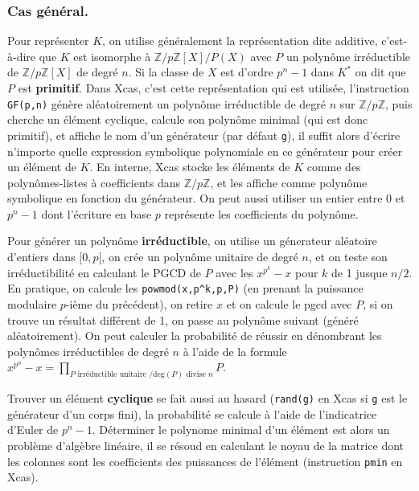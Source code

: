\documentclass[a4paper,11pt]{article}
\newcommand{\Z}{{\mathbb{Z}}}
\begin{document}
\begin{giacjshere}
\subsubsection{Cas g\'en\'eral.}
Pour repr\'esenter $K$, on utilise g\'en\'eralement la
repr\'esentation dite additive, c'est-\`a-dire que $K$
est isomorphe \`a $\Z/p\Z[X]/P(X)$ avec $P$ un polyn\^ome
irr\'eductible de $\Z/p\Z[X]$ de degr\'e $n$. Si la classe de $X$
est d'ordre $p^n-1$ dans $K^*$ on dit que $P$ est {\bf primitif}.
Dans Xcas, c'est cette repr\'esentation qui est utilis\'ee,
l'instruction \verb|GF(p,n)| g\'en\`ere al\'eatoirement
un polyn\^ome irr\'eductible de degr\'e $n$ sur $\Z/p\Z$,
puis cherche un \'el\'ement cyclique, calcule son polyn\^ome
minimal (qui est donc primitif), et affiche le nom d'un
g\'en\'erateur (par d\'efaut \verb|g|), 
il suffit alors d'\'ecrire n'importe quelle
expression symbolique polynomiale en ce g\'en\'erateur
pour cr\'eer un \'el\'ement de $K$. En interne, Xcas stocke
les \'el\'ements de $K$ comme des polyn\^omes-listes
\`a coefficients dans $\Z/p\Z$, et les affiche comme polyn\^ome
symbolique en fonction du g\'en\'erateur. On peut aussi
utiliser un entier entre 0 et $p^n-1$ dont l'\'ecriture en base
$p$ repr\'esente les coefficients du polyn\^ome.

Pour g\'en\'erer un polyn\^ome {\bf irr\'eductible}, on utilise
un g\'enerateur al\'eatoire d'entiers dans $[0,p[$,
on cr\'ee un polyn\^ome unitaire de degr\'e $n$, et
on teste son irr\'eductibilit\'e en calculant le PGCD
de $P$ avec les $x^{p^k}-x$ pour $k$ de 1 jusque $n/2$.
En pratique, on calcule les \verb|powmod(x,p^k,p,P)|
(en prenant la puissance modulaire $p$-i\`eme
du pr\'ec\'edent), on retire $x$ et on calcule le pgcd avec $P$,
si on trouve un r\'esultat diff\'erent de 1, on passe au polyn\^ome
suivant (g\'en\'er\'e al\'eatoirement).
On peut calculer la probabilit\'e de r\'eussir en d\'enombrant
les polyn\^omes irr\'eductibles de degr\'e $n$ \`a l'aide
de la formule $x^{p^n}-x=\prod_{P \mbox{ irréductible unitaire }/ \mbox{deg}(P)\mbox{ divise } n} P$.

Trouver un \'el\'ement {\bf cyclique} se fait aussi au hasard
(\verb|rand(g)| en Xcas si \verb|g| est le g\'en\'erateur
d'un corps fini), la
probabilit\'e se calcule \`a l'aide de l'indicatrice d'Euler de
$p^n-1$. D\'eterminer le polynome minimal d'un \'el\'ement
est alors un probl\`eme d'alg\`ebre lin\'eaire, il se r\'esoud
en calculant le noyau de la matrice dont les colonnes sont
les coefficients des puissances de l'\'el\'ement (instruction
\verb|pmin| en Xcas).


\end{giacjshere}
\end{document}
